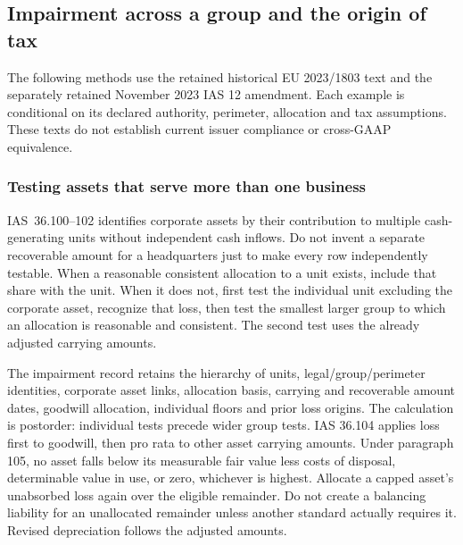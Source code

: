 \hypertarget{impairment-across-a-group-and-the-origin-of-tax}{%
\subsection{Impairment across a group and the origin of tax}\label{impairment-across-a-group-and-the-origin-of-tax}}

The following methods use the retained historical EU 2023/1803 text and the separately retained November 2023 IAS 12 amendment. Each example is conditional on its declared authority, perimeter, allocation and tax assumptions. These texts do not establish current issuer compliance or cross-GAAP equivalence.

\hypertarget{testing-assets-that-serve-more-than-one-business}{%
\subsubsection{Testing assets that serve more than one business}\label{testing-assets-that-serve-more-than-one-business}}

IAS~36.100--102 \citep[IAS~36.100--108]{eu20231803} identifies corporate assets by their contribution to multiple cash-generating units without independent cash inflows. Do not invent a separate recoverable amount for a headquarters just to make every row independently testable. When a reasonable consistent allocation to a unit exists, include that share with the unit. When it does not, first test the individual unit excluding the corporate asset, recognize that loss, then test the smallest larger group to which an allocation is reasonable and consistent. The second test uses the already adjusted carrying amounts.

The impairment record retains the hierarchy of units, legal/group/perimeter identities, corporate asset links, allocation basis, carrying and recoverable amount dates, goodwill allocation, individual floors and prior loss origins. The calculation is postorder: individual tests precede wider group tests. IAS 36.104 applies loss first to goodwill, then pro rata to other asset carrying amounts. Under paragraph 105, no asset falls below its measurable fair value less costs of disposal, determinable value in use, or zero, whichever is highest. Allocate a capped asset's unabsorbed loss again over the eligible remainder. Do not create a balancing liability for an unallocated remainder unless another standard actually requires it. Revised depreciation follows the adjusted amounts.

